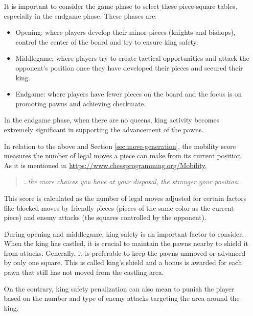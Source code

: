 \noindent It is important to consider the game phase to select these piece-square tables, especially in the endgame phase. These phases are:

\begin{itemize}
    \item Opening: where players develop their minor pieces (knights and bishops), control the center of the board and try to ensure king safety.
    \item Middlegame: where players try to create tactical opportunities and attack the opponent's position once they have developed their pieces and secured their king.
    \item Endgame: where players have fewer pieces on the board and the focus is on promoting pawns and achieving checkmate.
\end{itemize}

\noindent In the endgame phase, when there are no queens, king activity becomes extremely significant in supporting the advancement of the pawns.

\vspace{1em}

\noindent In relation to the above and Section \ref{sec:move-generation}, the mobility score measures the number of legal moves a piece can make from its current position. As it is mentioned in \url{https://www.chessprogramming.org/Mobility},
\begin{quotation}
\textit{\dots the more choices you have at your disposal, the stronger your position.}
\end{quotation} This score is calculated as the number of legal moves adjusted for certain factors like blocked moves by friendly pieces (pieces of the same color as the current piece) and enemy attacks (the squares controlled by the opponent).

\vspace{1em}

\noindent During opening and middlegame, king safety is an important factor to consider. When the king has castled, it is crucial to maintain the pawns nearby to shield it from attacks. Generally, it is preferable to keep the pawns unmoved or advanced by only one square. This is called king's shield and a bonus is awarded for each pawn that still has not moved from the castling area.

\vspace{1em}

\noindent On the contrary, king safety penalization can also mean to punish the player based on the number and type of enemy attacks targeting the area around the king.

